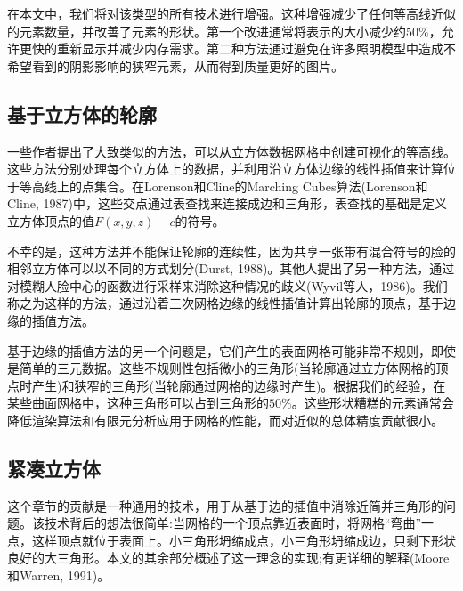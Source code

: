 \begin{CJK}{UTF8}{gbsn}
在本文中，我们将对该类型的所有技术进行增强。这种增强减少了任何等高线近似的元素数量，并改善了元素的形状。第一个改进通常将表示的大小减少约$50\%$，允许更快的重新显示并减少内存需求。第二种方法通过避免在许多照明模型中造成不希望看到的阴影影响的狭窄元素，从而得到质量更好的图片。

\subsection*{基于立方体的轮廓}
一些作者提出了大致类似的方法，可以从立方体数据网格中创建可视化的等高线。这些方法分别处理每个立方体上的数据，并利用沿立方体边缘的线性插值来计算位于等高线上的点集合。在Lorenson和Cline的Marching Cubes算法(Lorenson和Cline, 1987)中，这些交点通过表查找来连接成边和三角形，表查找的基础是定义立方体顶点的值$F(x, y, z) - c$的符号。

不幸的是，这种方法并不能保证轮廓的连续性，因为共享一张带有混合符号的脸的相邻立方体可以以不同的方式划分(Durst, 1988)。其他人提出了另一种方法，通过对模糊人脸中心的函数进行采样来消除这种情况的歧义(Wyvil等人，1986)。我们称之为这样的方法，通过沿着三次网格边缘的线性插值计算出轮廓的顶点，基于边缘的插值方法。

基于边缘的插值方法的另一个问题是，它们产生的表面网格可能非常不规则，即使是简单的三元数据。这些不规则性包括微小的三角形(当轮廓通过立方体网格的顶点时产生)和狭窄的三角形(当轮廓通过网格的边缘时产生)。根据我们的经验，在某些曲面网格中，这种三角形可以占到三角形的$50\%$。这些形状糟糕的元素通常会降低渲染算法和有限元分析应用于网格的性能，而对近似的总体精度贡献很小。

\subsection*{紧凑立方体}
这个章节的贡献是一种通用的技术，用于从基于边的插值中消除近简并三角形的问题。该技术背后的想法很简单:当网格的一个顶点靠近表面时，将网格“弯曲”一点，这样顶点就位于表面上。小三角形坍缩成点，小三角形坍缩成边，只剩下形状良好的大三角形。本文的其余部分概述了这一理念的实现;有更详细的解释(Moore和Warren, 1991)。


\end{CJK}

